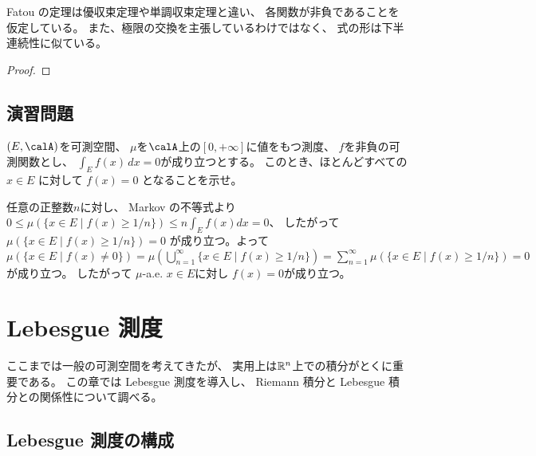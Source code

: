 \documentclass[report]{jlreq}
\begin{document}
Fatou の定理は優収束定理や単調収束定理と違い、
各関数が非負であることを仮定している。
また、極限の交換を主張しているわけではなく、
式の形は下半連続性に似ている。

\begin{proof}
    \TODO{}
\end{proof}

%
\newpage
\section{演習問題}

\begin{problem}[ChatGPT]
    $(E, \calA)$を可測空間、
    $\mu$を$\calA$上の$[0, +\infty]$に値をもつ測度、
    $f$を非負の可測関数とし、
    $\int_E f(x) \, dx = 0$が成り立つとする。
    このとき、ほとんどすべての $x \in E$ に対して
    $f(x) = 0$ となることを示せ。
\end{problem}

\begin{answer}
    任意の正整数$n$に対し、
    Markov の不等式より
    $0 \le \mu(\{ x \in E \mid f(x) \ge 1/n \}) \le n \int_E f(x) dx = 0$、
    したがって
    $\mu(\{ x \in E \mid f(x) \ge 1/n \}) = 0$
    が成り立つ。よって
    $\mu(\{ x \in E \mid f(x) \neq 0 \})
        = \mu(\bigcup_{n = 1}^\infty \{ x \in E \mid f(x) \ge 1/n \})
        = \sum_{n = 1}^\infty \mu(\{ x \in E \mid f(x) \ge 1/n \})
        = 0$
    が成り立つ。
    したがって
    $\mu$-a.e. $x \in E$に対し
    $f(x) = 0$が成り立つ。
\end{answer}




%
\chapter{Lebesgue 測度}

ここまでは一般の可測空間を考えてきたが、
実用上は$\mathbb{R}^n$上での積分がとくに重要である。
この章では Lebesgue 測度を導入し、
Riemann 積分と Lebesgue 積分との関係性について調べる。

%
\section{Lebesgue 測度の構成}
\end{document}
